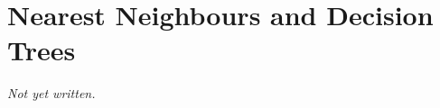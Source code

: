\chapter{Nearest Neighbours and Decision Trees}\label{ch:nearest-neighbours-trees}


\textit{Not yet written.}
